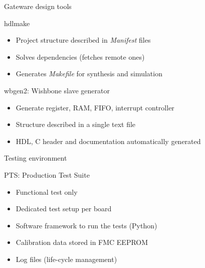 \documentclass[compress,red]{beamer}
\begin{document}
\begin{frame}{Gateware design tools}

  \begin{block}{hdlmake}
    \begin{itemize}
    \item Project structure described in \textit{Manifest} files
    \item Solves dependencies (fetches remote ones)
    \item Generates \textit{Makefile} for synthesis and simulation
    \end{itemize}
  \end{block}

  \begin{block}{wbgen2: Wishbone slave generator}
    \begin{itemize}
    \item Generate register, RAM, FIFO, interrupt controller
    \item Structure described in a single text file
    \item HDL, C header and documentation automatically generated
    \end{itemize}
  \end{block}

  \note[item]{}

\end{frame}

\begin{frame}{Testing environment}

  \begin{block}{PTS: Production Test Suite}
    \begin{itemize}
    \item Functional test only
    \item Dedicated test setup per board
    \item Software framework to run the tests (Python)
    \item Calibration data stored in FMC EEPROM
    \item Log files (life-cycle management)
    \end{itemize}
  \end{block}



  \note[item]{}

\end{frame}
\end{document}
